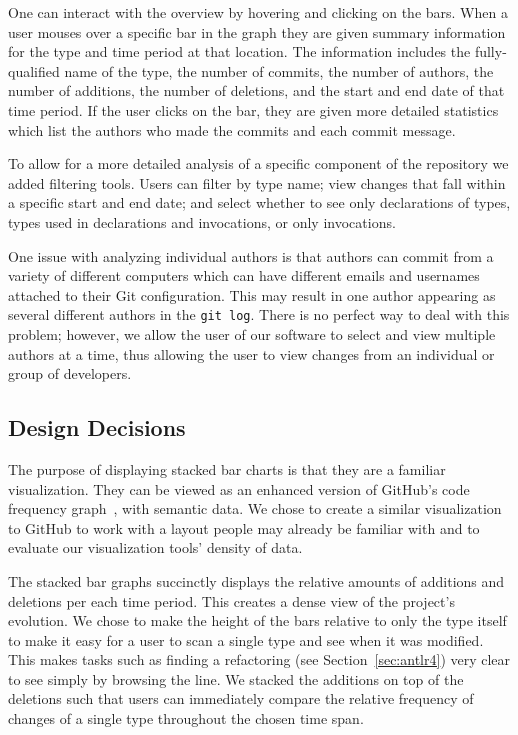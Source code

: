One can interact with the overview by hovering and clicking on the bars. When a user mouses over a specific bar in the graph they are given summary information for the type and time period at that location. The information includes the fully-qualified name of the type, the number of commits, the number of authors, the number of additions, the number of deletions, and the start and end date of that time period. If the user clicks on the bar, they are given more detailed statistics which list the authors who made the commits and each commit message. 

To allow for a more detailed analysis of a specific component of the repository we added filtering tools. Users can filter by type name; view changes that fall within a specific start and end date; and select whether to see only declarations of types, types used in declarations and invocations, or only invocations.

One issue with analyzing individual authors is that authors can commit from a variety of different computers which can have different emails and usernames attached to their Git configuration. This may result in one author appearing as several different authors in the \texttt{git log}. There is no perfect way to deal with this problem; however, we allow the user of our software to select and view multiple authors at a time, thus allowing the user to view changes from an individual or group of developers.

\subsection{Design Decisions}

The purpose of displaying stacked bar charts is that they are a familiar visualization. They can be viewed as an enhanced version of GitHub's code frequency graph~\cite{github-graphs}, with semantic data. We chose to create a similar visualization to GitHub to work with a layout people may already be familiar with and to evaluate our visualization tools' density of data.

The stacked bar graphs succinctly displays the relative amounts of additions and deletions per each time period. This creates a dense view of the project's evolution. We chose to make the height of the bars relative to only the type itself to make it easy for a user to scan a single type and see when it was modified. This makes tasks such as finding a refactoring (see Section~\ref{sec:antlr4}) very clear to see simply by browsing the line. We stacked the additions on top of the deletions such that users can immediately compare the relative frequency of changes of a single type throughout the chosen time span.

